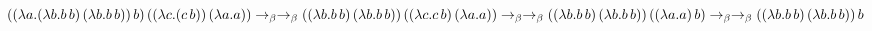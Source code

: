 \documentclass{article}
\begin{document}
	\LARGE
	$((\lambda a.(\lambda b.b\,b)\,(\lambda b.b\,b))\,b)\,((\lambda c.(c\,b))\,(\lambda a.a)) \to_\beta
	\\* \to_\beta ((\lambda b.b\,b)\,(\lambda b.b\,b))\,((\lambda c.c\,b)\,(\lambda a.a)) \to_\beta
	\\* \to_\beta ((\lambda b.b\,b)\,(\lambda b.b\,b))\,((\lambda a.a)\,b) \to_\beta 
	\\* \to_\beta ((\lambda b.b\,b)\,(\lambda b.b\,b))\,b$
\end{document}

